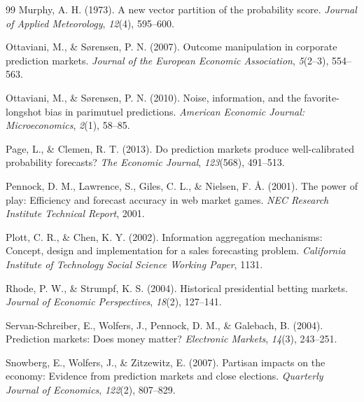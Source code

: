 \documentclass[12pt,letterpaper]{article}
\begin{document}
\begin{thebibliography}{99}
Murphy, A. H. (1973).
\newblock A new vector partition of the probability score.
\newblock \textit{Journal of Applied Meteorology}, \textit{12}(4), 595--600.

Ottaviani, M., \& S{\o}rensen, P. N. (2007).
\newblock Outcome manipulation in corporate prediction markets.
\newblock \textit{Journal of the European Economic Association}, \textit{5}(2--3), 554--563.

Ottaviani, M., \& S{\o}rensen, P. N. (2010).
\newblock Noise, information, and the favorite-longshot bias in parimutuel predictions.
\newblock \textit{American Economic Journal: Microeconomics}, \textit{2}(1), 58--85.

Page, L., \& Clemen, R. T. (2013).
\newblock Do prediction markets produce well-calibrated probability forecasts?
\newblock \textit{The Economic Journal}, \textit{123}(568), 491--513.

Pennock, D. M., Lawrence, S., Giles, C. L., \& Nielsen, F. {\AA}. (2001).
\newblock The power of play: Efficiency and forecast accuracy in web market games.
\newblock \textit{NEC Research Institute Technical Report}, 2001.

Plott, C. R., \& Chen, K. Y. (2002).
\newblock Information aggregation mechanisms: Concept, design and implementation for a sales forecasting problem.
\newblock \textit{California Institute of Technology Social Science Working Paper}, 1131.

Rhode, P. W., \& Strumpf, K. S. (2004).
\newblock Historical presidential betting markets.
\newblock \textit{Journal of Economic Perspectives}, \textit{18}(2), 127--141.

Servan-Schreiber, E., Wolfers, J., Pennock, D. M., \& Galebach, B. (2004).
\newblock Prediction markets: Does money matter?
\newblock \textit{Electronic Markets}, \textit{14}(3), 243--251.

Snowberg, E., Wolfers, J., \& Zitzewitz, E. (2007).
\newblock Partisan impacts on the economy: Evidence from prediction markets and close elections.
\newblock \textit{Quarterly Journal of Economics}, \textit{122}(2), 807--829.


\end{thebibliography}
\end{document}
